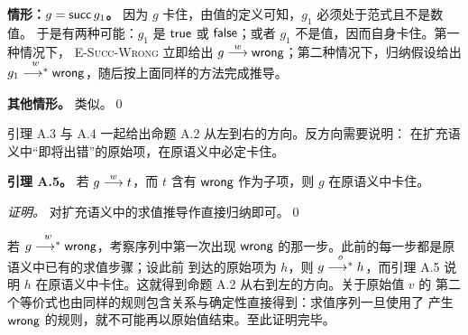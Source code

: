 \begin{taplauthorsolutionentrybox}
\medskip\noindent
\textbf{情形：\(g=\mathsf{succ}\,g_1\)。}
因为 \(g\) 卡住，由值的定义可知，\(g_1\) 必须处于范式且不是数值。
于是有两种可能：\(g_1\) 是 \(\mathsf{true}\) 或 \(\mathsf{false}\)；或者
\(g_1\) 不是值，因而自身卡住。第一种情况下，
\textsc{E-Succ-Wrong} 立即给出
\(g\mathrel{\overset{w}{\longrightarrow}}\mathsf{wrong}\)；第二种情况下，归纳假设给出
\(g_1\mathrel{\overset{w}{\longrightarrow^{*}}}\mathsf{wrong}\)，随后按上面同样的方法完成推导。

\medskip\noindent
\textbf{其他情形。}
类似。\qed

引理 A.3 与 A.4 一起给出命题 A.2 从左到右的方向。反方向需要说明：
在扩充语义中“即将出错”的原始项，在原语义中必定卡住。

\medskip
\textbf{引理 A.5。}
若 \(g\mathrel{\overset{w}{\longrightarrow}} t\)，而 \(t\) 含有 \(\mathsf{wrong}\) 作为子项，则
\(g\) 在原语义中卡住。

\textit{证明。}
对扩充语义中的求值推导作直接归纳即可。\qed

若 \(g\mathrel{\overset{w}{\longrightarrow^{*}}}\mathsf{wrong}\)，考察序列中第一次出现
\(\mathsf{wrong}\) 的那一步。此前的每一步都是原语义中已有的求值步骤；设此前
到达的原始项为 \(h\)，则 \(g\mathrel{\overset{o}{\longrightarrow^{*}}} h\)，而引理 A.5 说明 \(h\)
在原语义中卡住。这就得到命题 A.2 从右到左的方向。关于原始值 \(v\) 的
第二个等价式也由同样的规则包含关系与确定性直接得到：求值序列一旦使用了
产生 \(\mathsf{wrong}\) 的规则，就不可能再以原始值结束。至此证明完毕。


\end{taplauthorsolutionentrybox}

